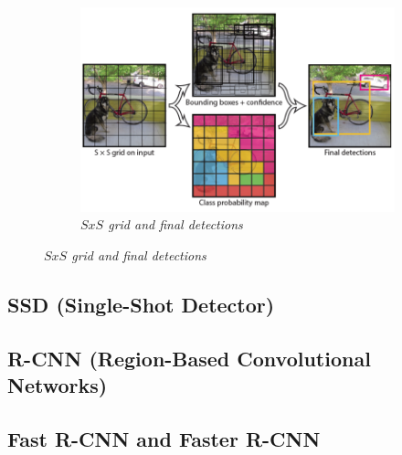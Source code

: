 \begin{figure}[H]
    \centering
    \begin{subfigure}[b]{0.6\textwidth}
        \centering
        \includegraphics[width=\textwidth]{Figures/2. Related Work/yolo_3.png}
        \caption{\textit{$SxS$ grid and final detections} \cite{yolo_images}}
    \end{subfigure}
\end{figure}

\subsection{SSD (Single-Shot Detector)}

\subsection{R-CNN (Region-Based Convolutional Networks)}

\subsection{Fast R-CNN and Faster R-CNN}